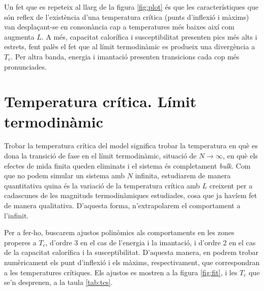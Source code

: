 \documentclass[a4paper]{article}
\begin{document}
Un fet que es repeteix al llarg de la figura \ref{fig:plot} és que les característiques que són reflex de l'existència d'una temperatura crítica (punts d'inflexió i màxims) van desplaçant-se en consonància cap a temperatures més baixes així com augmenta $L$. A més, capacitat calorífica i susceptibilitat presenten pics més alts i estrets, fent palès el fet que al límit termodinàmic es produeix una divergència a $T_c$. Per altra banda, energia i imantació presenten transicions cada cop més pronunciades.

\section{Temperatura crítica. Límit termodinàmic}

Trobar la temperatura crítica del model significa trobar la temperatura en què es dona la transició de fase en el límit termodinàmic, situació de $N \to \infty$, en què els efectes de mida finita queden eliminats i el sistema és completament \textit{bulk}. Com que no podem simular un sistema amb $N$ infinita, estudiarem de manera quantitativa quina és la variació de la temperatura crítica amb $L$ creixent per a cadascunes de les magnituds termodinàmiques estudiades, cosa que ja havíem fet de manera qualitativa. D'aquesta forma, n'extrapolarem el comportament a l'infinit.

Per a fer-ho, buscarem ajustos polinòmics als comportaments en les zones properes a $T_c$, d'ordre 3 en el cas de l'energia i la imantació, i d'ordre 2 en el cas de la capacitat calorífica i la susceptibilitat. D'aquesta manera, en podrem trobar numèricament els punt d'inflexió i els màxims, respectivament, que correspondran a les temperatures crítiques. Els ajustos es mostren a la figura \ref{fig:fit}, i les $T_c$ que se'n desprenen, a la taula \ref{tab:tcs}.
\end{document}
